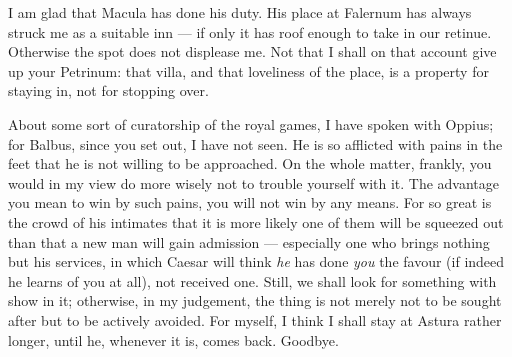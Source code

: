 

 I am glad that Macula has done his duty. His place at Falernum has always struck me as a suitable inn --- if only it has roof enough to take in our retinue. Otherwise the spot does not displease me. Not that I shall on that account give up your Petrinum: that villa, and that loveliness of the place, is a property for staying in, not for stopping over.

 About some sort of curatorship of the royal games, I have spoken with Oppius; for Balbus, since you set out, I have not seen. He is so afflicted with pains in the feet that he is not willing to be approached. On the whole matter, frankly, you would in my view do more wisely not to trouble yourself with it. The advantage you mean to win by such pains, you will not win by any means. For so great is the crowd of his intimates that it is more likely one of them will be squeezed out than that a new man will gain admission --- especially one who brings nothing but his services, in which Caesar will think \textit{he} has done \textit{you} the favour (if indeed he learns of you at all), not received one. Still, we shall look for something with show in it; otherwise, in my judgement, the thing is not merely not to be sought after but to be actively avoided. For myself, I think I shall stay at Astura rather longer, until he, whenever it is, comes back. Goodbye.
